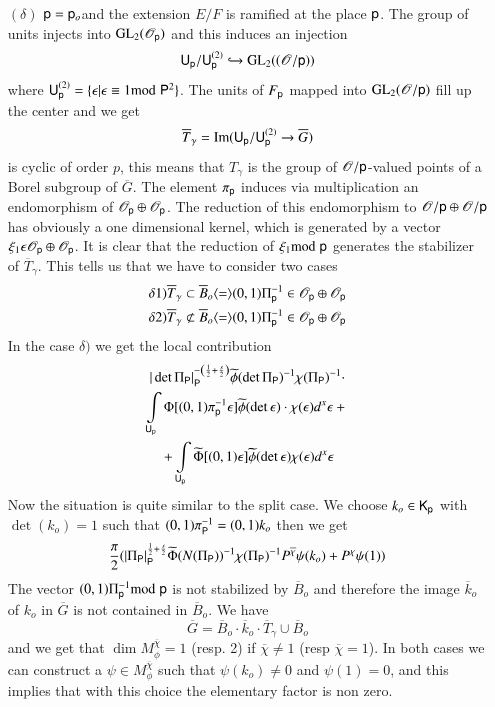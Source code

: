 \begin{itemize}
\item[$(\delta)$] $\mathsf{p}=\mathsf{p}_{o}$\pageoriginale and the extension $E/F$ is ramified at the place $\mathsf{p}$. The group of units injects into $\mathrm{GL}_{2}(\mathscr{O}_{\mathsf{p}})$ and this induces an injection
$$
\mathsf{U}_{\mathsf{p}}/\mathsf{U}_{\mathsf{p}}^{(2)}\hookrightarrow \mathrm{GL}_{2}((\mathscr{O}/\mathsf{p}))
$$
where $\mathsf{U}^{(2)}_{\mathsf{p}}=\{\epsilon|\epsilon\equiv 1{\rm{mod}}\kern.3em \mathsf{P}^{2}\}$. The units of $F_{\mathsf{p}}$ mapped into $\mathrm{GL}_{2}(\mathscr{O}/\mathsf{p})$ fill up the center and we get
$$
\overline{T}_{\gamma}=\mathrm{Im}(\mathsf{U}_{\mathsf{p}}/\mathsf{U}_{\mathsf{p}}^{(2)}\to \overline{G})
$$
is cyclic of order $p$, this means that $T_{\gamma}$ is the group of $\mathscr{O}/\mathsf{p}$-valued points of a Borel subgroup of $\overline{G}$. The element $\pi_{\mathsf{p}}$ induces via multiplication an endomorphism of $\mathscr{O}_{\mathsf{p}}\oplus \mathscr{O}_{\mathsf{p}}$. The reduction of this endomorphism to $\mathscr{O}/\mathsf{p}\oplus \mathscr{O}/\mathsf{p}$ has obviously a one dimensional kernel, which is generated by a vector $\xi_{1}\epsilon \mathscr{O}_{\mathsf{p}}\oplus \mathscr{O}_{\mathsf{p}}$. It is clear that the reduction of $\xi_{1}{\rm{mod}}\kern.3em \mathsf{p}$ generates the stabilizer of $\overline{T}_{\gamma}$. This tells us that we have to consider two cases
\begin{align*}
& \delta 1)\overline{T}_{\gamma}\subset \overline{B}_{o}\langle =\rangle (0,1)\Pi^{-1}_{\sfp}\in \mathscr{O}_{\sfp}\oplus \mathscr{O}_{\sfp}\\
& \delta 2)\overline{T}_{\gamma}\nsubset \overline{B}_{o}\langle =\rangle (0,1)\Pi^{-1}_{\sfp}\in \mathscr{O}_{\sfp}\oplus \mathscr{O}_{\sfp}
\end{align*}
In the case $\delta)$ we get the local contribution
\begin{gather*}
|\det \Pi_{\mathsf{P}}|^{-\left(\frac{1}{2}+\frac{s}{2}\right)}_{\mathsf{P}}\widetilde{\phi}(\det\Pi_{\mathsf{P}})^{-1}\chi(\Pi_{\mathsf{P}})^{-1}\cdot\\
\int\limits_{\mathsf{U}_{\mathsf{p}}}\Phi[(0,1)\pi^{-1}_{\mathsf{p}}\epsilon]\widetilde{\phi}(\det \epsilon)\cdot \chi(\epsilon)d^{x}\epsilon+{}\\
{}+ \int\limits_{\mathsf{U}_{\mathsf{p}}}\widetilde{\Phi}[(0,1)\epsilon]\widetilde{\phi}(\det \epsilon)\chi(\epsilon)d^{x}\epsilon
\end{gather*}
Now the situation is quite similar to the split case. We choose $k_{o}\in \mathsf{K}_{\mathsf{p}}$ with $\det(k_{o})=1$ such that $(0,1)\pi^{-1}_{\mathsf{P}}=(0,1)k_{o}$ then we get
$$
\frac{\pi}{2}(|\Pi_{\mathsf{P}}|^{\frac{1}{2}+\frac{s}{2}}_{\mathsf{P}}\widetilde{\Phi}(N(\Pi_{\mathsf{P}}))^{-1}\chi(\Pi_{\mathsf{P}})^{-1}P^{\overline{\chi}}\psi(k_{o})+P^{\chi}\psi(1))
$$
The vector $(0,1)\Pi^{-1}_{\mathsf{p}}{\rm{mod}}\kern.3em \mathsf{p}$ is not stabilized by $\overline{B}_{o}$ and therefore the image $\overline{k}_{o}$ of $k_{o}$ in $\overline{G}$ is not contained in $\overline{B}_{o}$. We have
$$
\overline{G}=\overline{B}_{o}\cdot \overline{k}_{o}\cdot \overline{T}_{\gamma}\cup \overline{B}_{o}
$$
and we get that $\dim M^{\overline{\chi}}_{\phi}=1$ (resp. 2) if $\overline{\chi}\neq 1$ (resp $\overline{\chi}=1$). In both cases we can construct a $\psi\in M^{\overline{\chi}}_{\phi}$ such that $\psi(k_{o})\neq 0$ and $\psi(1)=0$, and this implies that with this choice the elementary factor is non zero.


\end{itemize}

